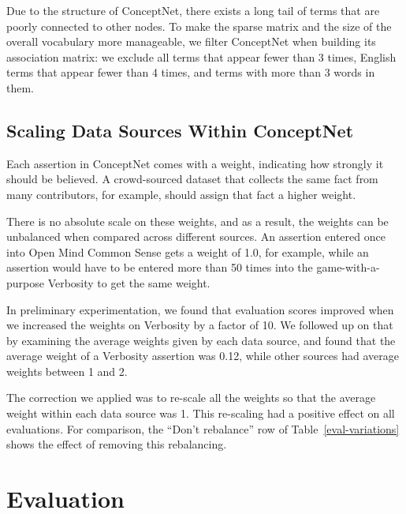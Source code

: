 \documentclass[letterpaper]{article}
\begin{document}
Due to the structure of ConceptNet, there exists a long tail of terms that are
poorly connected to other nodes. To make the sparse matrix and the size of the
overall vocabulary more manageable, we filter ConceptNet when building its
association matrix: we exclude all terms that appear fewer than 3 times, English
terms that appear fewer than 4 times, and terms with more than 3 words in them.

\subsection{Scaling Data Sources Within ConceptNet}

Each assertion in ConceptNet comes with a weight, indicating how strongly it
should be believed. A crowd-sourced dataset that collects the same fact from
many contributors, for example, should assign that fact a higher weight.

There is no absolute scale on these weights, and as a result, the weights can
be unbalanced when compared across different sources. An assertion entered once
into Open Mind Common Sense gets a weight of 1.0, for example, while an
assertion would have to be entered more than 50 times into the
game-with-a-purpose Verbosity to get the same weight.

In preliminary experimentation, we found that evaluation scores improved when
we increased the weights on Verbosity by a factor of 10. We followed up on that
by examining the average weights given by each data source, and found that the
average weight of a Verbosity assertion was 0.12, while other sources had
average weights between 1 and 2.

The correction we applied was to re-scale all the weights so that the average
weight within each data source was 1. This re-scaling had a positive effect
on all evaluations. For comparison, the ``Don't rebalance'' row of
Table~\ref{eval-variations} shows the effect of removing this rebalancing.

\section{Evaluation}
\end{document}
